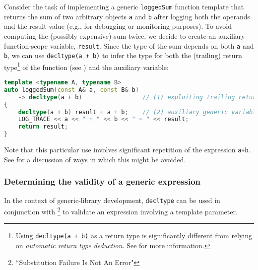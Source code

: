 Consider the task of implementing a generic \lstinline!loggedSum! function
template that returns the sum of two arbitrary objects \lstinline!a! and
\lstinline!b! after logging both the operands and the result value (e.g.,
for debugging or monitoring purposes). To avoid computing the (possibly
expensive) sum twice, we decide to create an auxiliary function-scope
variable, \lstinline!result!. Since the type of the sum depends on both
\lstinline!a! and \lstinline!b!, we can use
\lstinline!decltype(a!~\lstinline!+!~\lstinline!b)! to infer the type for both
the (trailing) return type{\cprotect\footnote{Using
\lstinline!decltype(a!~\lstinline!+!~\lstinline!b)! as a return type is
significantly different from relying on \emph{automatic return type
  deduction}. See %
 for more information.}} of the
function (see %
) and the auxiliary variable:

\begin{lstlisting}[language=C++]
template <typename A, typename B>
auto loggedSum(const A& a, const B& b)
    -> decltype(a + b)                 // (1) exploiting trailing return types
{
    decltype(a + b) result = a + b;    // (2) auxiliary generic variable
    LOG_TRACE << a << " + " << b << " = " << result;
    return result;
}
\end{lstlisting}
Note that this particular use involves significant repetition of the expression \lstinline!a+b!.  See
for a discussion of ways in which this might be avoided.

\subsubsection[Determining the validity of a generic expression]{Determining the validity of a generic expression}\label{determining-the-validity-of-a-generic-expression}

In the context of generic-library development, \lstinline!decltype! can be
used in conjunction with \footnote{``Substitution Failure Is Not An Error"} to validate an expression involving a
template parameter.

